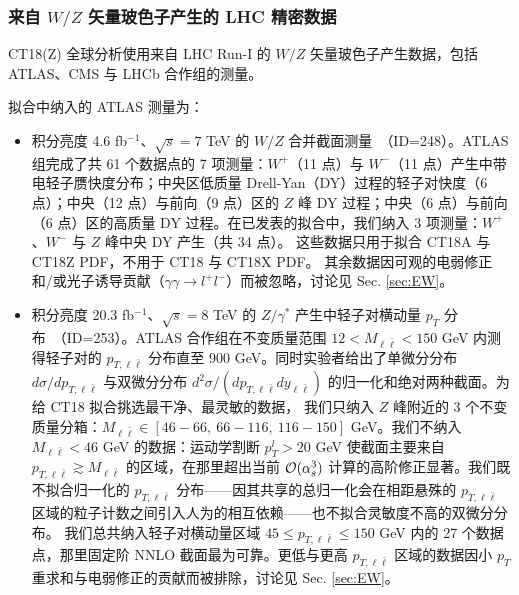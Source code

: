 \subsubsection{来自 $W/Z$ 矢量玻色子产生的 LHC 精密数据
\label{sec:DataWZ}
}


CT18(Z) 全球分析使用来自 LHC Run-I 的 $W/Z$ 矢量玻色子产生数据，包括 ATLAS、CMS 与 LHCb 合作组的测量。

拟合中纳入的 ATLAS 测量为：

\begin{itemize}

	\item 积分亮度 4.6 fb$^{-1}$、$\sqrt{s}=7$ TeV 的 $W/Z$ 合并截面测量~\cite{Aaboud:2016btc}（ID=248）。ATLAS 组完成了共 61 个数据点的 7 项测量：$W^+$（11 点）与 $W^-$（11 点）产生中带电轻子赝快度分布；中央区低质量 Drell-Yan（DY）过程的轻子对快度（6 点）；中央（12 点）与前向（9 点）区的 $Z$ 峰 DY 过程；中央（6 点）与前向（6 点）区的高质量 DY 过程。在已发表的拟合中，我们纳入 3 项测量：$W^+$、$W^-$ 与 $Z$ 峰中央 DY 产生（共 34 点）。
	这些数据只用于拟合 CT18A 与 CT18Z PDF，不用于 CT18 与 CT18X PDF。
	其余数据因可观的电弱修正和/或光子诱导贡献（$\gamma\gamma\to l^+l^-$）而被忽略，讨论见 Sec. \ref{sec:EW}。



	\item 积分亮度 20.3 fb$^{-1}$、$\sqrt{s}=8$ TeV 的 $Z/\gamma^*$ 产生中轻子对横动量 $p_T$ 分布~\cite{Aad:2015auj}（ID=253）。ATLAS 合作组在不变质量范围 $12<M_{\ell \bar \ell}<150$ GeV 内测得轻子对的 $p_{T,  \ell \bar \ell}$ 分布直至 900 GeV。同时实验者给出了单微分分布 $d\sigma/d p_{T,  \ell \bar \ell}$ 与双微分分布 $d^2\sigma/(d p_{T,  \ell \bar \ell}d y_{\ell \bar \ell})$ 的归一化和绝对两种截面。为给 CT18 拟合挑选最干净、最灵敏的数据，
	我们只纳入 $Z$ 峰附近的 3 个不变质量分箱：$M_{\ell \bar \ell}\in[46-66,\ 66-116,\ 116-150]$ GeV。我们不纳入 $M_{\ell \bar \ell} < 46$ GeV 的数据：运动学割断 $p_T^l>20$ GeV 使截面主要来自 $p_{T,  \ell \bar \ell} \gtrsim M_{\ell \bar \ell}$ 的区域，在那里超出当前 ${\cal O}(\alpha_s^3)$ 计算的高阶修正显著。我们既不拟合归一化的 $p_{T,  \ell \bar \ell}$ 分布——因其共享的总归一化会在相距悬殊的 $p_{T,  \ell \bar \ell}$ 区域的粒子计数之间引入人为的相互依赖——也不拟合灵敏度不高的双微分分布。
	我们总共纳入轻子对横动量区域 $45\! \leq\! p_{T,  \ell \bar \ell}\! \leq\! 150$ GeV 内的 27 个数据点，那里固定阶 NNLO 截面最为可靠。更低与更高 $p_{T,  \ell \bar \ell}$ 区域的数据因小 $p_T$ 重求和与电弱修正的贡献而被排除，讨论见 Sec. \ref{sec:EW}。
\end{itemize}

